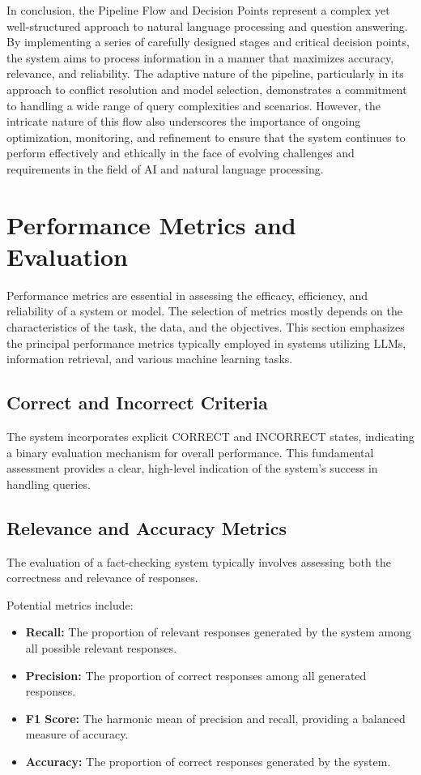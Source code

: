 In conclusion, the Pipeline Flow and Decision Points represent a complex yet well-structured approach to natural language processing and question answering.
By implementing a series of carefully designed stages and critical decision points, the system aims to process information in a manner that maximizes accuracy, relevance, and reliability.
The adaptive nature of the pipeline, particularly in its approach to conflict resolution and model selection, demonstrates a commitment to handling a wide range of query complexities and scenarios.
However, the intricate nature of this flow also underscores the importance of ongoing optimization, monitoring, and refinement to ensure that the system continues to perform effectively and ethically in the face of evolving challenges and requirements in the field of AI and natural language processing.

\section{Performance Metrics and Evaluation}\label{sec:performance-metrics-and-evaluation}
Performance metrics are essential in assessing the efficacy, efficiency, and reliability of a system or model.
The selection of metrics mostly depends on the characteristics of the task, the data, and the objectives.
This section emphasizes the principal performance metrics typically employed in systems utilizing LLMs, information retrieval, and various machine learning tasks.

\subsection{Correct and Incorrect Criteria}\label{subsec:passed-and-failed-criteria}
The system incorporates explicit CORRECT and INCORRECT states, indicating a binary evaluation mechanism for overall performance.
This fundamental assessment provides a clear, high-level indication of the system's success in handling queries.

\subsection{Relevance and Accuracy Metrics}\label{subsec:relevance-and-accuracy-metrics}
The evaluation of a fact-checking system typically involves assessing both the correctness and relevance of responses.

Potential metrics include:
\begin{itemize}
    \item \textbf{Recall:} The proportion of relevant responses generated by the system among all possible relevant responses.
    \item \textbf{Precision:} The proportion of correct responses among all generated responses.
    \item \textbf{F1 Score:} The harmonic mean of precision and recall, providing a balanced measure of accuracy.
    \item \textbf{Accuracy:} The proportion of correct responses generated by the system.
\end{itemize}

